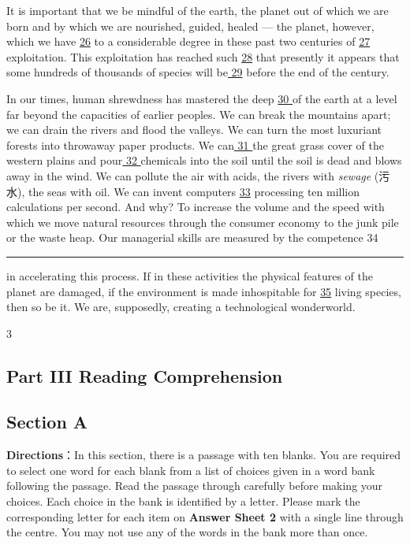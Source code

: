 \documentclass[UTF8,11pt]{ctexart}
\begin{document}
It is important that we be mindful of the earth, the planet out of which we are born and by which we are nourished, guided, healed — the planet, however, which we have \uline{26} to a considerable degree in these past two centuries of \uline{27} exploitation. This exploitation has reached such \uline{28} that presently it appears that some hundreds of thousands of species will be\uline{ 29} before the end of the century.


In our times, human shrewdness has mastered the deep \uline{30 }of the earth at a level far beyond the capacities of earlier peoples. We can break the mountains apart; we can drain the rivers and flood the valleys. We can turn the most luxuriant forests into throwaway paper products. We can\uline{ 31 }the great grass cover of the western plains and pour\uline{ 32 }chemicals into the soil until the soil is dead and blows away in the wind. We can pollute the air with acids, the rivers with\textit{ sewage} (污水), the seas with oil. We can invent computers \uline{33} processing ten million calculations per second. And why? To increase the volume and the speed with which we move natural resources through the consumer economy to the junk pile or the waste heap. Our managerial skills are measured by the competence 34\par\noindent\rule{.95\linewidth}{.4pt}\par  in accelerating this process. If in these activities the physical features of the planet are damaged, if the environment is made inhospitable for \uline{35} living species, then so be it. We are, supposedly, creating a technological wonderworld.


3


\subsection*{\textbf{Part} III \textbf{Reading Comprehension}}


\subsection*{\textbf{Section A}}


\textbf{Directions}：In this section, there is a passage with ten blanks. You are required to select one word for each blank from a list of choices given in a word bank following the passage. Read the passage through carefully before making your choices. Each choice in the bank is identified by a letter. Please mark the corresponding letter for each item on \textbf{Answer Sheet 2} with a single line through the centre. You may not use any of the words in the bank more than once.
\end{document}
